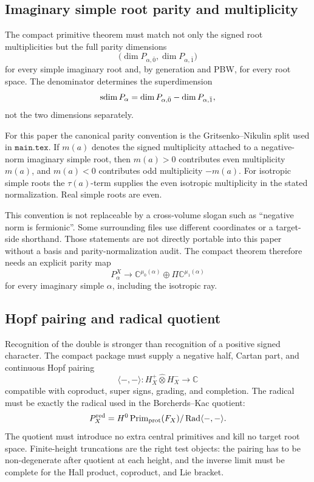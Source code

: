 \subsection{Imaginary simple root parity and multiplicity}

The compact primitive theorem must match not only the signed root
multiplicities but the full parity dimensions
\[
   \bigl(\dim P_{\alpha,\bar 0},\dim P_{\alpha,\bar 1}\bigr)
\]
for every simple imaginary root and, by generation and PBW, for every root
space.  The denominator determines the superdimension
\[
   \operatorname{sdim} P_\alpha=
   \dim P_{\alpha,\bar0}-\dim P_{\alpha,\bar1},
\]
not the two dimensions separately.

For this paper the canonical parity convention is the
Gritsenko--Nikulin split used in \(\texttt{main.tex}\).  If \(m(a)\) denotes
the signed multiplicity attached to a negative-norm imaginary simple root,
then \(m(a)>0\) contributes even multiplicity \(m(a)\), and \(m(a)<0\)
contributes odd multiplicity \(-m(a)\).  For isotropic simple roots the
\(\tau(a)\)-term supplies the even isotropic multiplicity in the stated
normalization.  Real simple roots are even.

This convention is not replaceable by a cross-volume slogan such as
``negative norm is fermionic''.  Some surrounding files use different
coordinates or a target-side shorthand.  Those statements are not directly
portable into this paper without a basis and parity-normalization audit.
The compact theorem therefore needs an explicit parity map
\[
   P^X_\alpha\longrightarrow
   \mathbb C^{\mu_0(\alpha)}\oplus \Pi\mathbb C^{\mu_1(\alpha)}
\]
for every imaginary simple \(\alpha\), including the isotropic ray.

\subsection{Hopf pairing and radical quotient}

Recognition of the double is stronger than recognition of a positive signed
character.  The compact package must supply a negative half, Cartan part, and
continuous Hopf pairing
\[
   \langle -,-\rangle:
   H_X^+\widehat\otimes H_X^-\longrightarrow \mathbb C
\]
compatible with coproduct, super signs, grading, and completion.  The radical
must be exactly the radical used in the Borcherds--Kac quotient:
\[
   P_X^{\operatorname{red}}
   =
   H^0\operatorname{Prim}_{\mathrm{prot}}(F_X)/\operatorname{Rad}\langle-,-\rangle .
\]
The quotient must introduce no extra central primitives and kill no target
root space.  Finite-height truncations are the right test objects: the pairing
has to be non-degenerate after quotient at each height, and the inverse limit
must be complete for the Hall product, coproduct, and Lie bracket.

